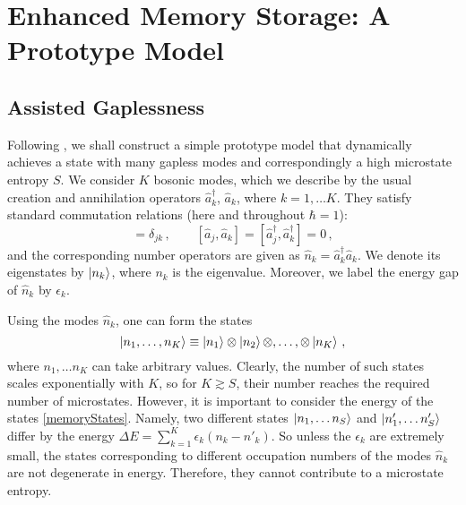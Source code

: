 \documentclass[aps,prd,reprint,superscriptaddress,nofootinbib]{revtex4-2}
\begin{document}
\section{Enhanced Memory Storage: A Prototype Model}
\label{sec:model}
\subsection{Assisted Gaplessness}
Following \cite{1712.02233, 1801.03918, 1805.10292}, we shall construct a 
simple prototype model that dynamically achieves a state 
with many gapless modes and correspondingly a high microstate entropy $S$. We consider $K$ bosonic modes, which we describe by the usual creation and annihilation operators $\hat{a}_k^\dagger$, $\hat{a}_k$, where $k=1,\ldots K$. They satisfy standard commutation relations (here and throughout $\hbar =1$):
 \begin{equation} 
[\hat{a}_j,\hat{a}_k^{\dagger}] = \delta_{jk}\,,\qquad
[\hat{a}_j,\hat{a}_k]  =   [\hat{a}_j^{\dagger},\hat{a}_k^{\dagger}] =0\,,  
\label{algebra} 
\end{equation} 
and the corresponding number operators are given as $\hat{n}_k=\hat{a}_k^\dagger \hat{a}_k$. We denote its eigenstates by $\ket{n_k}$, where $n_k$ is the eigenvalue. Moreover, we label the energy gap of $\hat{n}_k$ by 
$\epsilon_k$.

Using the modes $\hat{n}_k$, one can form the states
\begin{equation} \label{memoryStates}
	\ket{n_1,\ldots,n_K} \equiv  \ket{n_1}\otimes \ket{n_2}\otimes,\ldots,\otimes \ket{n_K} \,,
\end{equation}
where $n_1,\ldots n_K$ can take arbitrary values. Clearly, the number of such states scales exponentially with $K$, so for $K\gtrsim S$, their number reaches the required number of microstates. However, it is important to consider the energy of the states \eqref{memoryStates}. Namely, two different states $\ket{n_1, \ldots n_S}$ and $\ket{n'_1, \ldots n'_S}$ differ by the energy $\Delta E = \sum_{k=1}^K \epsilon_k (n_k-n'_k)$. So unless the $\epsilon_k$ are extremely small, the states corresponding to different occupation numbers of the modes $\hat{n}_k$ are not degenerate in energy. Therefore, they cannot contribute to a microstate entropy.
\end{document}
